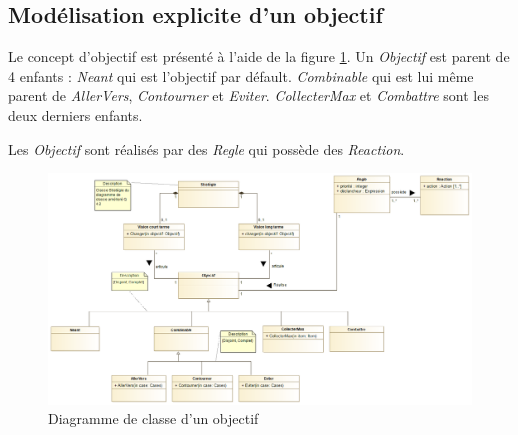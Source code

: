 
\subsection{Modélisation explicite d'un objectif}
\label{sec:question10}

Le concept d'objectif est présenté à l'aide de la figure \ref{fig:objectif}. Un \emph{Objectif} est parent de 4 enfants : \emph{Neant} qui est l'objectif par défault. \emph{Combinable} qui est lui même parent de \emph{AllerVers}, \emph{Contourner} et \emph{Eviter}.
\emph{CollecterMax} et \emph{Combattre} sont les deux derniers enfants.

Les \emph{Objectif} sont réalisés par des \emph{Regle} qui possède des \emph{Reaction}.

\begin{figure}
	\centering
	\includegraphics[width=500pt]{assets/class__Objectif}
	\caption{Diagramme de classe d'un objectif}
	\label{fig:objectif}
\end{figure}
